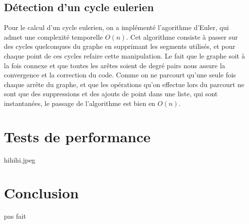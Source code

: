 \documentclass[a4paper,11pt]{article}
\begin{document}
\subsection{Détection d'un cycle eulerien}

Pour le calcul d'un cycle eulerien, on a implémenté l'agorithme d'Euler, qui admet une complexité temporelle $O(n)$. Cet algorithme consiste à passer sur des cycles quelconques du graphe en supprimant les segments
utilisés, et pour chaque point de ces cycles refaire cette manipulation. Le fait que le graphe soit à la fois connexe et que toutes
les arêtes soient de degré pairs nous assure la convergence et la correction du code. Comme on ne parcourt qu'une seule fois
chaque arrête du graphe, et que les opérations qu'on effectue lors du parcourt ne sont que des suppressions et des ajouts
de point dans une liste, qui sont instantanées, le passage de l'algorithme est bien en $O(n)$.

\section{Tests de performance}

hihihi.jpeg

\section{Conclusion}

pas fait
\end{document}
